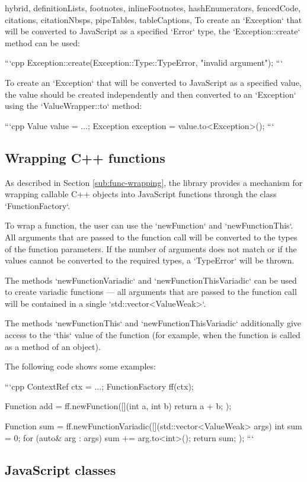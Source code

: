 \begin{markdown*}{%
  hybrid,
  definitionLists,
  footnotes,
  inlineFootnotes,
  hashEnumerators,
  fencedCode,
  citations,
  citationNbsps,
  pipeTables,
  tableCaptions,
}
To create an `Exception` that will be converted to JavaScript as a specified `Error` type, the `Exception::create` method can be used:

```cpp
Exception::create(Exception::Type::TypeError, "invalid argument");
```

To create an `Exception` that will be converted to JavaScript as a specified value, the value should be created independently and then converted to an `Exception` using the `ValueWrapper::to` method:

```cpp
Value value = ...;
Exception exception = value.to<Exception>();
```

\subsection{Wrapping C++ functions}

As described in Section \ref{sub:func-wrapping}, the library provides a mechanism for wrapping callable C++ objects into JavaScript functions through the class `FunctionFactory`.

To wrap a function, the user can use the `newFunction` and `newFunctionThis`. All arguments that are passed to the function call will be converted to the types of the function parameters. If the number of arguments does not match or if the values cannot be converted to the required types, a `TypeError` will be thrown.

The methods `newFunctionVariadic` and `newFunctionThisVariadic` can be used to create variadic functions --- all arguments that are passed to the function call will be contained in a single `std::vector<ValueWeak>`.

The methods `newFunctionThis` and `newFunctionThisVariadic` additionally give access to the `this` value of the function (for example, when the function is called as a method of an object).

The following code shows some examples:

```cpp
ContextRef ctx = ...;
FunctionFactory ff(ctx);

Function add = ff.newFunction([](int a, int b) { return a + b; });

Function sum = ff.newFunctionVariadic([](std::vector<ValueWeak> args) {
    int sum = 0;
    for (auto& arg : args) {
        sum += arg.to<int>();
    }
    return sum;
});
```

\subsection{JavaScript classes}


\end{markdown*}
